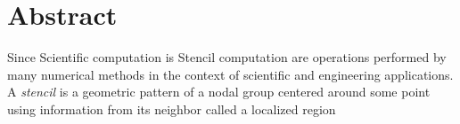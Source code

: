 \chapter{Abstract}
Since 
Scientific computation is 
Stencil computation are operations performed by many numerical methods in the context of scientific and engineering applications. A \textit{stencil} is a geometric pattern of a nodal group centered around some point  using information from its neighbor called a localized region